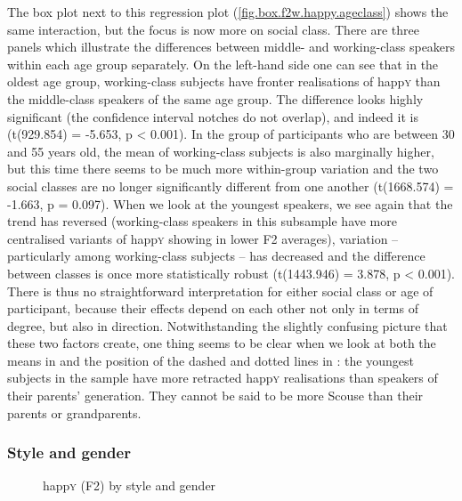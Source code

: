 The box plot next to this regression plot (\ref{fig.box.f2w.happy.ageclass}) shows the same interaction, but the focus is now more on social class.
There are three panels which illustrate the differences between middle- and working-class speakers within each age group separately.
On the left-hand side one can see that in the oldest age group, working-class subjects have fronter realisations of happ\textsc{y} than the middle-class speakers of the same age group.
The difference looks highly significant (the confidence interval notches do not overlap), and indeed it is (t(929.854) = -5.653, p < 0.001).
In the group of participants who are between 30 and 55 years old, the mean of working-class subjects is also marginally higher, but this time there seems to be much more within-group variation and the two social classes are no longer significantly different from one another (t(1668.574) = -1.663, p = 0.097).
When we look at the youngest speakers, we see again that the trend has reversed (working-class speakers in this subsample have more centralised variants of happ\textsc{y} showing in lower F2 averages), variation -- particularly among working-class subjects -- has decreased and the difference between classes is once more statistically robust (t(1443.946) = 3.878, p < 0.001).
There is thus no straightforward interpretation for either social class or age of participant, because their effects depend on each other not only in terms of degree, but also in direction.
Notwithstanding the slightly confusing picture that these two factors create, one thing seems to be clear when we look at both the means in  and the position of the dashed and dotted lines in : the youngest subjects in the sample have more retracted happ\textsc{y} realisations than speakers of their parents' generation.
They cannot be said to be more Scouse than their parents or grandparents.

\subsubsection{Style and gender}
\label{sec.prod.res.vow.happy.f2.stylegender}

\begin{figure}[b]
	
		\resizebox{.49\linewidth}{!}{} 
	\caption{happ\textsc{y} (F2) by style and gender}
	\label{fig.box.f2w.happy.stylegender}
\end{figure}


